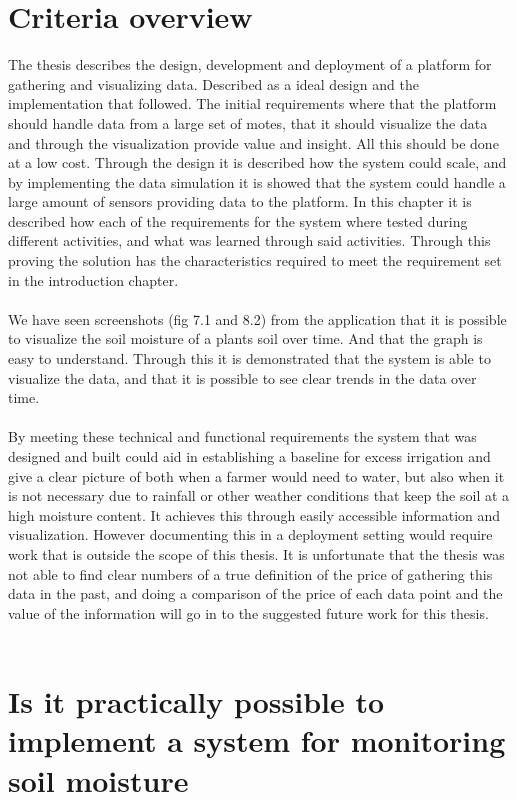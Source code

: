\documentclass[]{uiophd}
\begin{document}
\section{Criteria overview}
The thesis describes the design, development and deployment of a platform for gathering and visualizing data. Described as a ideal design and the implementation that followed. The initial requirements where that the platform should handle data from a large set of motes, that it should visualize the data and through the visualization provide value and insight. All this should be done at a low cost. Through the design it is described how the system could scale, and by implementing the data simulation it is showed that the system could handle a large amount of sensors providing data to the platform. In this chapter it is described how each of the requirements for the system where tested during different activities, and what was learned through said activities. Through this proving the solution has the characteristics required to meet the requirement set in the introduction chapter.
\\\\
We have seen screenshots (fig 7.1 and 8.2) from the application that it is possible to visualize the soil moisture of a plants soil over time. And that the graph is easy to understand. Through this it is demonstrated that the system is able to visualize the data, and that it is possible to see clear trends in the data over time.
\\\\
By meeting these technical and functional requirements the system that was  designed and built could aid in establishing a baseline for excess irrigation and give a clear picture of both when a farmer would need to water, but also when it is not necessary due to rainfall or other weather conditions that keep the soil at a high moisture content. It achieves this through easily accessible information and visualization. However documenting this in a deployment setting would require work that is outside the scope of this thesis. It is unfortunate that the thesis was not able to find clear numbers of a true definition of the price of gathering this data in the past, and doing a comparison of the price of each data point and the value of the information will go in to the suggested future work for this thesis.
\\\\
\section{ Is it practically possible to implement a system for monitoring soil moisture }
\end{document}
